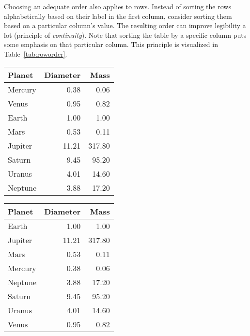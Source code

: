 Choosing an adequate order also applies to rows. Instead of sorting the rows alphabetically based on their label in the first column, consider sorting them based on a particular column's value. The resulting order can improve legibility a lot (principle of \emph{continuity}). Note that sorting the table by a specific column puts some emphasis on that particular column. This principle is visualized in Table~\ref{tab:roworder}.

\begin{table*}[tb]
  \caption{\label{tab:roworder} Listing planets in order from the sun, in alphabetical order, and in descending order of diameter (reproduced from \cite{Carter12} with permission).}
  \centering
  \footnotesize %
  {\renewcommand{\arraystretch}{1.1} %
  \begin{tabularx}{0.3\linewidth}{@{}Xrr@{}} %
    \toprule
    Planet & Diameter & Mass \\
    \midrule
    Mercury & 0.38 & 0.06 \\
    Venus & 0.95 & 0.82 \\
    Earth & 1.00 & 1.00 \\
    Mars & 0.53 & 0.11 \\
    Jupiter & 11.21 & 317.80 \\
    Saturn & 9.45 & 95.20 \\
    Uranus & 4.01 & 14.60 \\
    Neptune & 3.88 & 17.20 \\
    \bottomrule
  \end{tabularx}
  \hspace{\fill}
  \begin{tabularx}{0.3\linewidth}{@{}Xrr@{}} %
    \toprule
    Planet & Diameter & Mass \\
    \midrule
    Earth & 1.00 & 1.00 \\
    Jupiter & 11.21 & 317.80 \\
    Mars & 0.53 & 0.11 \\
    Mercury & 0.38 & 0.06 \\
    Neptune & 3.88 & 17.20 \\
    Saturn & 9.45 & 95.20 \\
    Uranus & 4.01 & 14.60 \\
    Venus & 0.95 & 0.82 \\

\end{tabularx}}
\end{table*}
